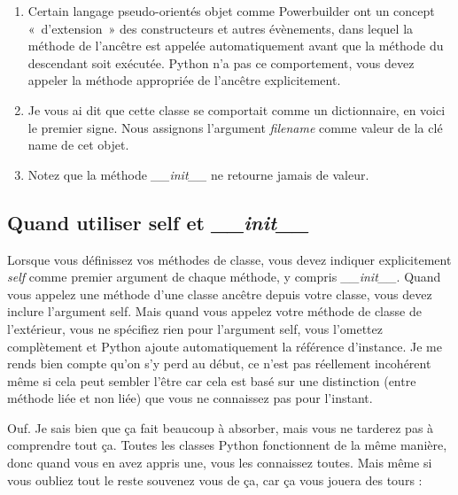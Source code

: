 \begin{enumerate}
\item{Certain langage pseudo-orientés objet comme Powerbuilder ont un concept «~d'extension~» des constructeurs et autres évènements, dans lequel la méthode de l'ancêtre est appelée automatiquement avant que la méthode du descendant soit exécutée. Python n'a pas ce comportement, vous devez appeler la méthode appropriée de l'ancêtre explicitement.}
\item{Je vous ai dit que cette classe se comportait comme un dictionnaire, en voici le premier signe. Nous assignons l'argument \emph{filename} comme valeur de la clé name de cet objet.}
\item{Notez que la méthode \emph{\_\_init\_\_} ne retourne jamais de valeur.}
\end{enumerate}

\subsection{Quand utiliser self et \emph{\_\_init\_\_}}

Lorsque vous définissez vos méthodes de classe, vous devez indiquer explicitement \emph{self} comme premier argument de chaque méthode, y compris \emph{\_\_init\_\_}. Quand vous appelez une méthode d'une classe ancêtre depuis votre classe, vous devez inclure l'argument self. Mais quand vous appelez votre méthode de classe de l'extérieur, vous ne spécifiez rien pour l'argument self, vous l'omettez complètement et Python ajoute automatiquement la référence d'instance. Je me rends bien compte qu'on s'y perd au début, ce n'est pas réellement incohérent même si cela peut sembler l'être car cela est basé sur une distinction (entre méthode liée et non liée) que vous ne connaissez pas pour l'instant.

Ouf. Je sais bien que ça fait beaucoup à absorber, mais vous ne tarderez pas à comprendre tout ça. Toutes les classes Python fonctionnent de la même manière, 
donc quand vous en avez appris une, vous les connaissez toutes. Mais même si vous oubliez tout le reste souvenez vous de ça, car ça vous jouera des tours :



